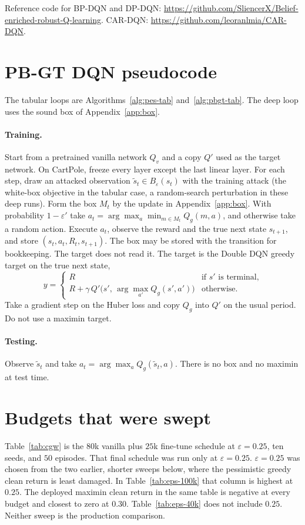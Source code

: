 \documentclass[10pt,twocolumn]{article}
\begin{document}
Reference code for BP-DQN and DP-DQN: \url{https://github.com/SliencerX/Belief-enriched-robust-Q-learning}.
CAR-DQN: \url{https://github.com/leoranlmia/CAR-DQN}.

\section{PB-GT DQN pseudocode}
\label{app:alg}

The tabular loops are Algorithms~\ref{alg:pes-tab} and~\ref{alg:pbgt-tab}.
The deep loop uses the sound box of Appendix~\ref{app:box}.

\paragraph{Training.}
Start from a pretrained vanilla network $Q_v$ and a copy $Q'$ used as the target network.
On CartPole, freeze every layer except the last linear layer.
For each step, draw an attacked observation $\tilde s_t\in B_\varepsilon(s_t)$ with the training attack (the white-box objective in the tabular case, a random-search perturbation in these deep runs).
Form the box $M_t$ by the update in Appendix~\ref{app:box}.
With probability $1-\varepsilon'$ take $a_t=\arg\max_a\min_{m\in M_t}Q_g(m,a)$, and otherwise take a random action.
Execute $a_t$, observe the reward and the true next state $s_{t+1}$, and store $(s_t,a_t,R_t,s_{t+1})$.
The box may be stored with the transition for bookkeeping.
The target does not read it.
The target is the Double DQN greedy target on the true next state,
\[
y=
\begin{cases}
R & \text{if $s'$ is terminal,}\\
R+\gamma\,Q'\bigl(s',\,\arg\max_{a'}Q_g(s',a')\bigr) & \text{otherwise.}
\end{cases}
\]
Take a gradient step on the Huber loss and copy $Q_g$ into $Q'$ on the usual period.
Do not use a maximin target.

\paragraph{Testing.}
Observe $\tilde s_t$ and take $a_t=\arg\max_a Q_g(\tilde s_t,a)$.
There is no box and no maximin at test time.

\section{Budgets that were swept}
\label{app:eps}

Table~\ref{tab:cgw} is the $80$k vanilla plus $25$k fine-tune schedule at $\varepsilon{=}0.25$, ten seeds, and $50$ episodes.
That final schedule was run only at $\varepsilon{=}0.25$.
$\varepsilon{=}0.25$ was chosen from the two earlier, shorter sweeps below, where the pessimistic greedy clean return is least damaged.
In Table~\ref{tab:eps-100k} that column is highest at $0.25$.
The deployed maximin clean return in the same table is negative at every budget and closest to zero at $0.30$.
Table~\ref{tab:eps-40k} does not include $0.25$.
Neither sweep is the production comparison.
\end{document}
